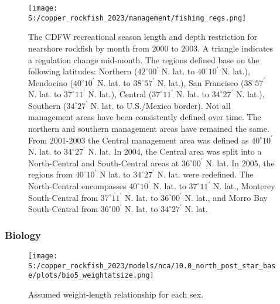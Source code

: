 \documentclass[11pt,
  letterpaper,
]{article}
\begin{document}
\pagebreak

\begin{figure}
{\centering
\texttt{[image: S:/copper\_rockfish\_2023/management/fishing\_regs.png]}
}
\caption{The CDFW recreational season length and depth restriction for nearshore rockfish by month from 2000 to 2003. A triangle indicates a regulation change mid-month. The regions defined base on the following latitudes: Northern ($42^\circ 00^\prime$ N. lat. to $40^\circ 10^\prime$ N. lat.), Mendocino ($40^\circ 10^\prime$ N. lat. to $38^\circ 57^\prime$ N. lat.), San Francisco ($38^\circ 57^\prime$ N. lat. to $37^\circ 11^\prime$ N. lat.), Central ($37^\circ 11^\prime$ N. lat. to $34^\circ 27^\prime$ N. lat.), Southern ($34^\circ 27^\prime$ N. lat. to U.S./Mexico border). Not all management areas have been consistently defined over time. The northern  and southern management areas have remained the same. From 2001-2003 the Central management area was defined as $40^\circ 10^\prime$ N. lat. to  $34^\circ 27^\prime$ N. lat. In 2004, the Central area was split into a North-Central and South-Central areas at $36^\circ 00^\prime$ N. lat. In 2005, the regions from $40^\circ 10^\prime$ N lat. to $34^\circ 27^\prime$ N. lat. were redefined. The North-Central encompasses $40^\circ 10^\prime$ N. lat. to $37^\circ 11^\prime$ N. lat., Monterey South-Central from $37^\circ 11^\prime$ N. lat. to $36^\circ 00^\prime$ N. lat., and Morro Bay South-Central from $36^\circ 00^\prime$ N. lat. to $34^\circ 27^\prime$ N. lat.\label{fig:depth-closures}}
\end{figure}

\pagebreak

\pagebreak

\subsubsection{Biology}\label{biology-1}

\begin{figure}
{\centering
\texttt{[image: S:/copper\_rockfish\_2023/models/nca/10.0\_north\_post\_star\_base/plots/bio5\_weightatsize.png]}
}
\caption{Assumed weight-length relationship for each sex.\label{fig:est-len-wght}}
\end{figure}

\pagebreak
\end{document}

